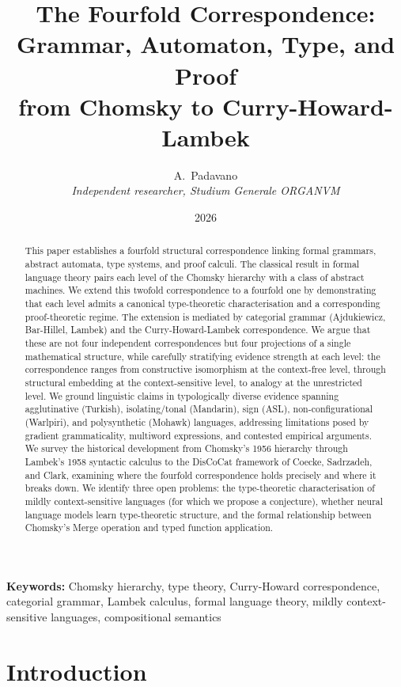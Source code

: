 \documentclass[12pt,a4paper]{article}
\title{The Fourfold Correspondence:\\Grammar, Automaton, Type, and Proof\\from Chomsky to Curry-Howard-Lambek}
\author{A.~Padavano\\
  \textit{Independent researcher, Studium Generale ORGANVM}}
\date{2026}
\begin{document}
\maketitle

\begin{abstract}
This paper establishes a fourfold structural correspondence linking formal
grammars, abstract automata, type systems, and proof calculi. The classical
result in formal language theory pairs each level of the Chomsky hierarchy with
a class of abstract machines. We extend this twofold correspondence to a
fourfold one by demonstrating that each level admits a canonical
type-theoretic characterisation and a corresponding proof-theoretic regime.
The extension is mediated by categorial grammar (Ajdukiewicz, Bar-Hillel,
Lambek) and the Curry-Howard-Lambek correspondence. We argue that these are
not four independent correspondences but four projections of a single
mathematical structure, while carefully stratifying evidence strength at each
level: the correspondence ranges from constructive isomorphism at the
context-free level, through structural embedding at the context-sensitive
level, to analogy at the unrestricted level. We ground linguistic claims in
typologically diverse evidence spanning agglutinative (Turkish),
isolating/tonal (Mandarin), sign (ASL), non-configurational (Warlpiri), and
polysynthetic (Mohawk) languages, addressing limitations posed by gradient
grammaticality, multiword expressions, and contested empirical arguments. We
survey the historical development from Chomsky's 1956 hierarchy through
Lambek's 1958 syntactic calculus to the DisCoCat framework of Coecke,
Sadrzadeh, and Clark, examining where the fourfold correspondence holds
precisely and where it breaks down. We identify three open problems: the
type-theoretic characterisation of mildly context-sensitive languages (for
which we propose a conjecture), whether neural language models learn
type-theoretic structure, and the formal relationship between Chomsky's Merge
operation and typed function application.
\end{abstract}

\noindent\textbf{Keywords:} Chomsky hierarchy, type theory, Curry-Howard
correspondence, categorial grammar, Lambek calculus, formal language theory,
mildly context-sensitive languages, compositional semantics

\bigskip

\section{Introduction}
\end{document}
